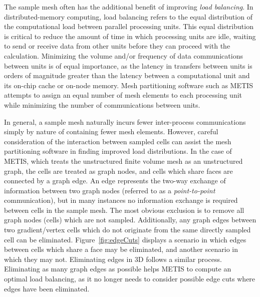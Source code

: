 The sample mesh often has the additional benefit of improving \textit{load balancing}. In distributed-memory computing, load balancing refers to the equal distribution of the computational load between parallel processing units. This equal distribution is critical to reduce the amount of time in which processing units are idle, waiting to send or receive data from other units before they can proceed with the calculation. Minimizing the volume and/or frequency of data communications between units is of equal importance, as the latency in transfers between units is orders of magnitude greater than the latency between a computational unit and its on-chip cache or on-node memory. Mesh partitioning software such as METIS~\cite{metis} attempts to assign an equal number of mesh elements to each processing unit while minimizing the number of communications between units.

In general, a sample mesh naturally incurs fewer inter-process communications simply by nature of containing fewer mesh elements. However, careful consideration of the interaction between sampled cells can assist the mesh partitioning software in finding improved load distributions. In the case of METIS, which treats the unstructured finite volume mesh as an unstructured graph, the cells are treated as graph nodes, and cells which share faces are connected by a graph edge. An edge represents the two-way exchange of information between two graph nodes (referred to as a \textit{point-to-point} communication), but in many instances no information exchange is required between cells in the sample mesh. The most obvious exclusion is to remove all graph nodes (cells) which are not sampled. Additionally, any graph edges between two gradient/vertex cells which do not originate from the same directly sampled cell can be eliminated. Figure~\ref{fig:edgeCuts} displays a scenario in which edges between cells which share a face may be eliminated, and another scenario in which they may not. Eliminating edges in 3D follows a similar process. Eliminating as many graph edges as possible helps METIS to compute an optimal load balancing, as it no longer needs to consider possible edge cuts where edges have been eliminated.

